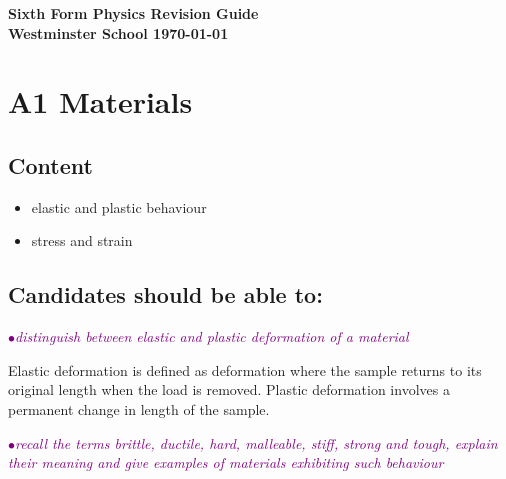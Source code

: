 \documentclass[a4paper,11pt,twoside]{memoir}
\newcommand{\theversion}{}
\newcounter{spec}[chapter]
\newcommand{\spec}[1]{\Needspace{5\baselineskip}\textcolor{purple}{$\bullet$\hspace{0.5cm}\textit{#1}}}
\begin{document}
\raggedbottom
\frontmatter
\small\forkme[east]
\begin{titlingpage}

\vspace*{\fill}
    \begin{center}\Huge\bfseries Sixth Form Physics Revision Guide \\ \vspace{3cm} \Large Westminster School
    \vfill \today \\ \theversion \end{center} 
	\thispagestyle{empty}
\end{titlingpage}

\tableofcontents

\mainmatter
\chapter{A1 Materials}
\setcounter{spec}{0}
\section*{Content}
\begin{itemize}
\item elastic and plastic behaviour
\item stress and strain
\end{itemize}

\section*{Candidates should be able to:}
\spec{distinguish between elastic and plastic deformation of a material}

Elastic deformation is defined as deformation where the sample returns to its original length when the load is removed. Plastic deformation involves a permanent change in length of the sample.

\spec{recall the terms brittle, ductile, hard, malleable, stiff, strong and tough, explain their meaning and give examples of materials exhibiting such behaviour}
\end{document}
